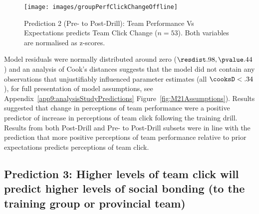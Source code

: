 \begin{CJK}{UTF8}{gbsn}
 \begin{figure}
     \centering
     \texttt{[image: images/groupPerfClickChangeOffline]}
     \caption{Prediction 2 (Pre- to Post-Drill): Team Performance Vs Expectations predicts Team Click Change ($n = 53$).  Both variables are normalised as z-scores.}
     \label{fig:groupPerfClickChangeCondition}
 \end{figure}

Model residuals were normally distributed around zero ($\resdist .98, \pvalue .44$) and an analysis of Cook's distances suggests that the model did not contain any observations that unjustifiably influenced parameter estimates (all $\cooksD < .34$), for full presentation of model assumptions, see Appendix~\ref{app9:analysisStudyPredictions} Figure~\ref{fig:M21Assumptions}).  Results suggested that change in perceptions of team performance were a positive predictor of increase in perceptions of team click following the training drill.  Results from both Post-Drill and Pre- to Post-Drill subsets were in line with the prediction that more positive perceptions of team performance relative to prior expectations predicts perceptions of team click.






\subsection{Prediction 3: Higher levels of team click will predict higher levels of social bonding (to the training group or provincial team)}


\end{CJK}
